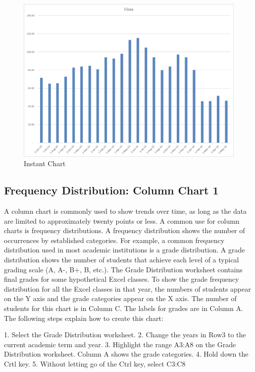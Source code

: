 \begin{figure}[H]
	\centering
	\includegraphics[width=\maxwidth{.95\linewidth}]{gfx/ch04_fig12}
	\caption{Instant Chart}
	\label{04:fig12}
\end{figure}





\subsection{Frequency Distribution: Column Chart 1}

A column chart is commonly used to show trends over time, as long as the data are limited to
approximately twenty points or less. A common use for column charts is frequency distributions. A
frequency distribution shows the number of occurrences by established categories. For example, a
common frequency distribution used in most academic institutions is a grade distribution. A grade
distribution shows the number of students that achieve each level of a typical grading scale (A, A-, B+,
B, etc.). The Grade Distribution worksheet contains final grades for some hypothetical Excel classes.
To show the grade frequency distribution for all the Excel classes in that year, the numbers of students
appear on the Y axis and the grade categories appear on the X axis. The number of students for this
chart is in Column C. The labels for grades are in Column A. The following steps explain how to
create this chart:

1. Select the Grade Distribution worksheet.
2. Change the years in Row3 to the current academic term and year.
3. Highlight the range A3:A8 on the Grade Distribution worksheet. Column A shows the grade
categories.
4. Hold down the Crtl key.
5. Without letting go of the Ctrl key, select C3:C8


